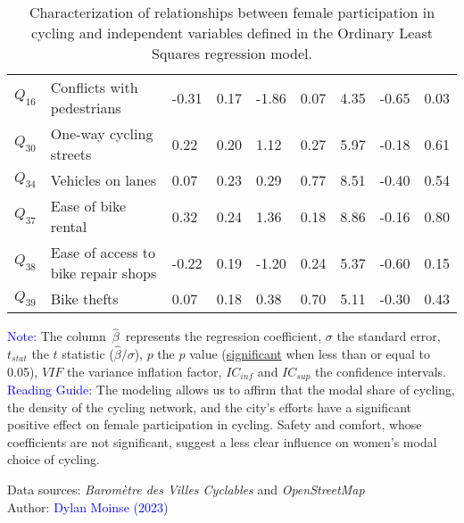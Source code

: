 \begin{table}[h!]
{\begin{tabular}{p{}p{}p{}p{}p{}p{}p{}p{}p{}}
\(Q_{16}\) & \small{Conflicts with pedestrians} & \small{-0.31} & \small{0.17} & \small{-1.86} & \small{0.07} & \small{4.35} & \small{-0.65} & \small{0.03} \\
\(Q_{30}\) & \small{One-way cycling streets} & \small{0.22} & \small{0.20} & \small{1.12} & \small{0.27} & \small{5.97} & \small{-0.18} & \small{0.61} \\
\(Q_{34}\) & \small{Vehicles on lanes} & \small{0.07} & \small{0.23} & \small{0.29} & \small{0.77} & \small{8.51} & \small{-0.40} & \small{0.54} \\
\(Q_{37}\) & \small{Ease of bike rental} & \small{0.32} & \small{0.24} & \small{1.36} & \small{0.18} & \small{8.86} & \small{-0.16} & \small{0.80} \\
\(Q_{38}\) & \small{Ease of access to bike repair shops} & \small{-0.22} & \small{0.19} & \small{-1.20} & \small{0.24} & \small{5.37} & \small{-0.60} & \small{0.15} \\
\(Q_{39}\) & \small{Bike thefts} & \small{0.07} & \small{0.18} & \small{0.38} & \small{0.70} & \small{5.11} & \small{-0.30} & \small{0.43} \\
        \hline
        \end{tabular}}
    \caption{Characterization of relationships between female participation in cycling and independent variables defined in the Ordinary Least Squares regression model.}
    \label{table-chap4:regression-genre-barometre-fub}
        \vspace{5pt}
        \begin{flushleft}\scriptsize{
        \textcolor{blue}{Note:} The column~$\hat{\beta}$~represents the regression coefficient, $\sigma$ the standard error, \(t_{stat}\) the $t$ statistic ($\hat{\beta}/\sigma$), $p$ the $p$ value (\underline{significant} when less than or equal to 0.05), \(VIF\) the variance inflation factor, \(IC_{inf}\) and \(IC_{sup}\) the confidence intervals.
        \\
        \textcolor{blue}{Reading Guide:} The modeling allows us to affirm that the modal share of cycling, the density of the cycling network, and the city's efforts have a significant positive effect on female participation in cycling. Safety and comfort, whose coefficients are not significant, suggest a less clear influence on women's modal choice of cycling.
        }\end{flushleft}
        \begin{flushright}\scriptsize{
        Data sources: \textsl{Baromètre des Villes Cyclables} \textcolor{blue}{\autocite{fub_barometre_2021}} and \textsl{OpenStreetMap} \textcolor{blue}{\autocite{openstreetmap_openstreetmap_2023}}
        \\
        Author: \textcolor{blue}{Dylan Moinse (2023)}
        }\end{flushright}
        \end{table}